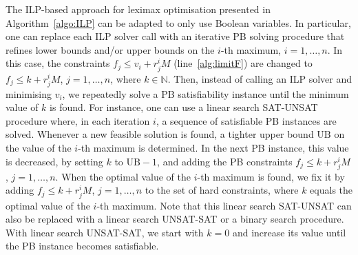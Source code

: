 \documentclass[a4paper,UKenglish,cleveref, autoref, thm-restate]{lipics-v2021}
\newcommand{\UB}{\text{UB}}
\begin{document}
The ILP-based approach for leximax optimisation presented in Algorithm~\ref{algo:ILP} can be adapted to only use Boolean variables.
In particular, one can replace each ILP solver call with an iterative
PB solving procedure that refines lower bounds and/or upper bounds on the $i$-th maximum, $i=1,\dots,n$.
In this case, the constraints $f_j \leq v_i + r^i_j M$ (line~\ref{alg:limitF}) 
are changed to $f_j \leq k + r^i_j M$, $j=1,\dots,n$, where $k\in\mathbb{N}$.
Then, instead of calling an ILP solver and minimising $v_i$, we repeatedly solve a PB satisfiability instance until the minimum value of $k$ is found.
For instance, one can use a linear search SAT-UNSAT procedure where, in each iteration $i$, a sequence of satisfiable PB instances are solved.
Whenever a new feasible solution is found, a tighter upper bound $\UB$ on the value of the
$i$-th maximum is determined.
In the next PB instance, this value is decreased, by setting $k$ to $\UB - 1$, and adding the PB constraints $f_j \leq k + r^i_j M$, $j=1,\dots,n$.
When the optimal value of the $i$-th maximum is found, we fix it by adding 
$f_j \leq k + r^i_j M$, $j=1,\dots,n$ to the set of hard constraints, 
where $k$ equals the optimal value of the $i$-th maximum.
Note that this linear search SAT-UNSAT can also be replaced with a linear search UNSAT-SAT or a binary search procedure. 
With linear search UNSAT-SAT, we start with $k=0$ and increase its value until the PB instance becomes satisfiable.
\end{document}

